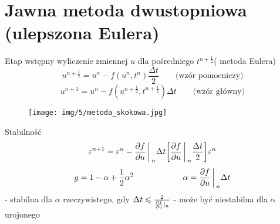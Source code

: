 \section{Jawna metoda dwustopniowa (ulepszona Eulera)}
\begin{frame}{Etap wstępny}
	wyliczenie zmiennej $u$ dla pośredniego $t^{n+\frac{1}{2}}$( metoda Eulera)
    $$u^{n+\frac{1}{2}} = u^n - f(u^n,t^n)\frac{\Delta t}{2} \qquad \text{(wzór pomocniczy)}$$
    $$u^{n+1} = u^n - f(u^{n+\frac{1}{2}},t^{n+\frac{1}{2}})\Delta t \qquad \text{(wzór główny)}$$
\end{frame}
\begin{frame}
	 \begin{figure}
	\texttt{[image: img/5/metoda\_skokowa.jpg]}
	\end{figure}
\end{frame}
\begin{frame}{Stabilność}
	$$\varepsilon^{n+1} = \varepsilon^n - \frac{\partial f}{\partial u}\bigg\arrowvert_n\Delta t\bigg[\frac{\partial f}{\partial u} \bigg\arrowvert_n\frac{\Delta t}{2}\bigg]\varepsilon^n$$
    $$g = 1-\alpha +\frac{1}{2}\alpha^2 \qquad \qquad \qquad \alpha = \frac{\partial f}{\partial u}\bigg\arrowvert_n \Delta t$$
    \newline
    - stabilna dla $\alpha$ rzeczywistego, gdy $\Delta t \leqslant \frac{2}{\frac{\partial f}{\partial u}\arrowvert_n}$
    \newline
    - może być niestabilna dla $\alpha$ urojonego
\end{frame}
